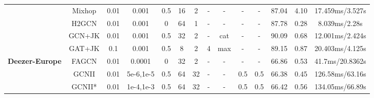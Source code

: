 \documentclass{article}
\newcommand{\0}{{\boldsymbol{0}}}
\newcommand{\6}{{\partial}}
\newcommand{\8}{{\infty}}
\newcommand{\4}{{\nabla}}
\begin{document}
\begin{table}[htbp]
{\begin{tabular}{c|c|cccccccccccc}
          &  Mixhop & 0.01  & 0.001 & 0.5   & 16    & 2     & - & - & - & - & 87.04 & 4.10  & {17.459ms/3.527s} \\
          & H2GCN & 0.01  & 0.001 & 0     & 64    & 1     & - & - & - & - & 87.78 & 0.28  & {8.039ms/2.28s} \\
          & GCN+JK & 0.01  & 0.001 & 0.5   & 32    & 2     & - & {cat} & - & - & 90.09 & 0.68  & {12.001ms/2.424s} \\
          &  GAT+JK & 0.1   & 0.001 & 0.5   & 8     & 2     & 4     & {max} & - & - & 89.15 & 0.87  & {20.403ms/4.125s} \\
          \midrule
    \multirow{3}[1]{*}{\textbf{Deezer-Europe}} & FAGCN & 0.01  & 0.0001 & 0     & 32    & 2     & -     & -     & -     & -     & 66.86 & 0.53  & {41.7ms/20.8362s} \\
          & GCNII & 0.01  & 5e-6,1e-5 & 0.5   & 64    & 32    & -     & -     & 0.5   & 0.5   & 66.38 & 0.45  & 126.58ms/63.16s \\
          & GCNII* & 0.01  & 1e-4,1e-3 & 0.5   & 64    & 32    & -     & -     & 0.5   & 0.5   & 66.42 & 0.56  & 134.05ms/66.89s \\
    \bottomrule
    \bottomrule
    \end{tabular}\label{tab:hyperparameters_baselines}}
\end{table} 
\end{document}
